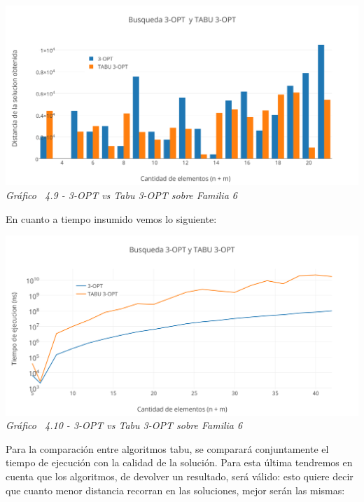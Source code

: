 \vspace*{0.3cm} \vspace*{0.3cm}
  \begin{center}
 \includegraphics[scale=0.5]{./EJ4/comparativorandom3opt.png}\\
 {            \textit{Gráfico \ 4.9 - 3-OPT vs Tabu 3-OPT sobre Familia 6}}
  \end{center}
  \vspace*{0.3cm}

En cuanto a tiempo insumido vemos lo siguiente:

\vspace*{0.3cm} \vspace*{0.3cm}
  \begin{center}
 \includegraphics[scale=0.5]{./EJ4/medicionrandom3opt.png}\\
 {            \textit{Gráfico \ 4.10 - 3-OPT vs Tabu 3-OPT sobre Familia 6}}
  \end{center}
  \vspace*{0.3cm}
  
Para la comparación entre algoritmos tabu, se comparará conjuntamente el tiempo de ejecución con la calidad de la solución. Para esta última tendremos en cuenta que los algoritmos, de devolver un resultado, será válido: esto quiere decir que cuanto menor distancia recorran en las soluciones, mejor serán las mismas:

